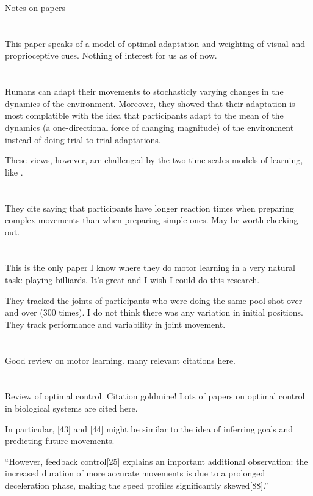 \documentclass{report}
\begin{document}
\begin{chapter}{Notes on papers}
\section{\cite{Beers_When_2002}}
This paper speaks of a model of optimal adaptation and weighting of visual and
proprioceptive cues. Nothing of interest for us as of now.

\section{\cite{Scheidt_Learning_2001}}
Humans can adapt their movements to stochasticly varying changes in the dynamics
of the environment. Moreover, they showed that their adaptation is most
complatible with the idea that participants adapt to the mean of the dynamics (a
one-directional force of changing magnitude) of the environment instead of doing
trial-to-trial adaptations.

These views, however, are challenged by the two-time-scales models of learning,
like \cite{Smith_Interacting_2006}.

\section{\cite{DeKleijn_Everyday_2014}}
They cite \cite{Henry_Increased_1960} saying that participants have longer
reaction times when preparing complex movements than when preparing simple
ones. May be worth checking out.

\section{\cite{Haar_Motor_2020}}
This is the only paper I know where they do motor learning in a very natural
task: playing billiards. It's great and I wish I could do this research.

They tracked the joints of participants who were doing the same pool shot over
and over (300 times). I do not think there was any variation in initial
positions. They track performance and variability in joint movement.

\section{\cite{Wolpert_Principles_2011}}
Good review on motor learning. many relevant citations here.

\section{\cite{Todorov_Optimality_2004}}
Review of optimal control. Citation goldmine! Lots of papers on optimal control
in biological systems are cited here.

In particular, [43] and [44] might be similar to the idea of inferring goals and
predicting future movements.

``However, feedback control[25] explains an important additional observation:
the increased duration of more accurate movements is due to a prolonged
deceleration phase, making the speed profiles significantly skewed[88].''

\end{chapter}
\end{document}
